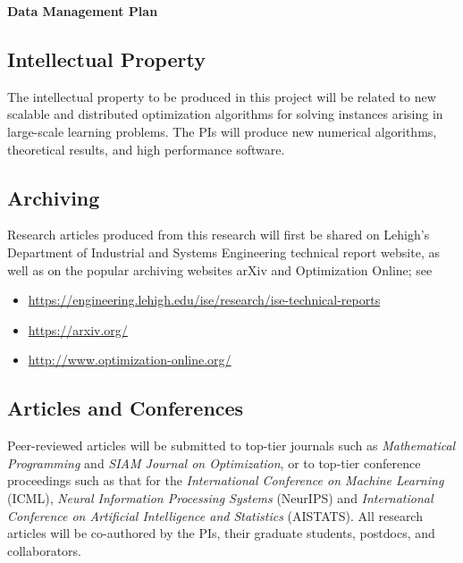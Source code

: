\documentclass[10pt]{SelfArx}
\begin{document}
\pagestyle{plain}


\begin{center}
{\color{color1} \bf \large
Data Management Plan}
\end{center}

\subsection*{Intellectual Property}

The intellectual property to be produced in this project will be related to new scalable and distributed optimization algorithms for solving instances arising in large-scale learning problems.  The PIs will produce new numerical algorithms, theoretical results, and high performance software.

\subsection*{Archiving}

Research articles produced from this research will first be shared on Lehigh's Department of Industrial and Systems Engineering technical report website, as well as on the popular archiving websites arXiv and Optimization Online; see
\begin{itemize}
  \item \href{https://engineering.lehigh.edu/ise/research/ise-technical-reports}{https://engineering.lehigh.edu/ise/research/ise-technical-reports}
  \item \href{https://arxiv.org/}{https://arxiv.org/}
  \item \href{http://www.optimization-online.org/}{http://www.optimization-online.org/}
\end{itemize}

\subsection*{Articles and Conferences} 
 
Peer-reviewed articles will be submitted to top-tier journals such as {\em Mathematical Programming} and {\em SIAM Journal on Optimization}, or to top-tier conference proceedings such as that for the {\em International Conference on Machine Learning} (ICML), {\em Neural Information Processing Systems} (NeurIPS) and {\em International Conference on Artificial Intelligence and Statistics} (AISTATS).  All research articles will be co-authored by the PIs, their graduate students, postdocs, and collaborators.
\end{document}

